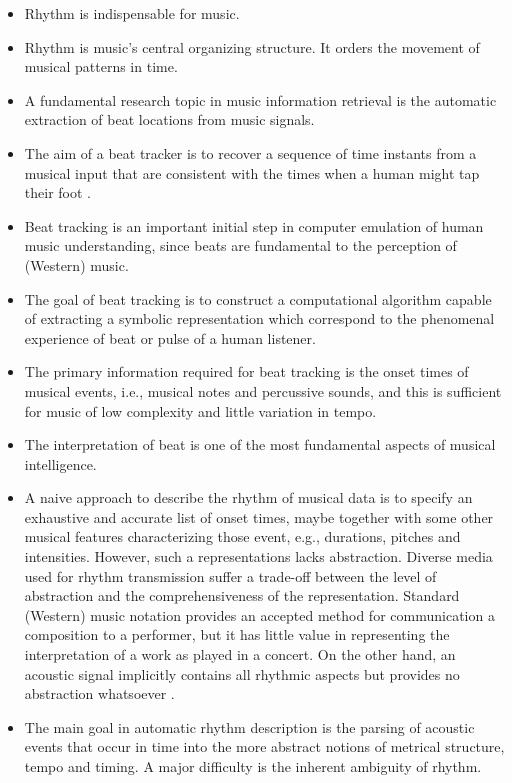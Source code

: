 \documentclass{scrartcl}
\begin{document}
\begin{itemize}
\item Rhythm is indispensable for music.
\item Rhythm is music’s central organizing structure. It orders the movement of musical patterns in time. 
\item A fundamental research topic in music information retrieval is the automatic extraction of beat locations from music signals. 
\item The aim of a beat tracker is to recover a sequence of time instants from a musical input that are consistent with the times when a human might tap their foot \cite{Ellis2007}. 
\item Beat tracking is an important initial step in computer emulation of human music understanding, since beats are fundamental to the perception of (Western) music.
\item The goal of beat tracking is to construct a computational algorithm capable of extracting a symbolic representation which correspond to the phenomenal experience of beat or pulse of a human listener.
\item The primary information required for beat tracking is the onset times of musical events, i.e., musical notes and percussive sounds, and this is sufficient for music of low complexity and little variation in tempo.
\item The interpretation of beat is one of the most fundamental aspects of musical intelligence.
\item A naive approach to describe the rhythm of musical data is to specify an exhaustive and accurate list of onset times, maybe together with some other musical features characterizing those event, e.g., durations, pitches and intensities. However, such a representations lacks abstraction. Diverse media used for rhythm transmission suffer a trade-off between the level of abstraction and the comprehensiveness of the representation. Standard (Western) music notation provides an accepted method for communication a composition to a performer, but it has little value in representing the interpretation of a work as played in a concert. On the other hand, an acoustic signal implicitly contains all rhythmic aspects but provides no abstraction whatsoever \cite{Gouyon2005}.
\item The main goal in automatic rhythm description is the parsing of acoustic events that occur in time into the more abstract notions of metrical structure, tempo and timing. A major difficulty is the inherent ambiguity of rhythm.

\end{itemize}
\end{document}
